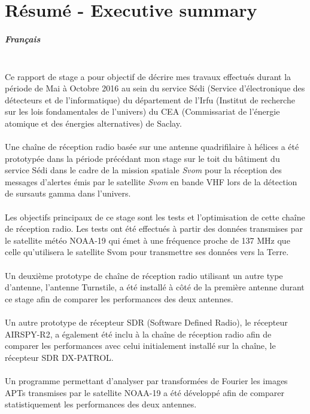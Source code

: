 \documentclass[12pt,fleqn]{book} %
\begin{document}
\pagestyle{fancy} %
\setcounter{part}{-1}
\part{Résumé - Executive summary}
\subsubsection{Français}
~\\\indent Ce rapport de stage a pour objectif de décrire mes travaux effectués durant la période de Mai à Octobre 2016 au sein du service Sédi (Service d'électronique des détecteurs et de l'informatique) du département de l'Irfu (Institut de recherche sur les lois fondamentales de l'univers) du CEA (Commissariat de l'énergie atomique et des énergies alternatives) de Saclay.
~\\\\Une chaîne de réception radio basée sur une antenne quadrifilaire à hélices a été prototypée dans la période précédant mon stage sur le toit du bâtiment du service Sédi dans le cadre de la mission spatiale \emph{Svom} pour la réception des messages d'alertes émis par le satellite \emph{Svom} en bande VHF lors de la détection de sursauts gamma dans l'univers. 
~\\\\Les objectifs principaux de ce stage sont les tests et l'optimisation de cette chaîne de réception radio. Les tests ont été effectués à partir des données transmises par le satellite météo NOAA-19 qui émet à une fréquence proche de 137 MHz que celle qu'utilisera le satellite Svom pour transmettre ses données vers la Terre.
~\\\\Un deuxième prototype de chaîne de réception radio utilisant un autre type d'antenne, l'antenne Turnstile, a été installé à côté de la première antenne durant ce stage afin de comparer les performances des deux antennes. 
~\\\\Un autre prototype de récepteur SDR (Software Defined Radio), le récepteur AIRSPY-R2, a également été inclu à la chaîne de réception radio afin de comparer les performances avec celui initialement installé sur la chaîne, le récepteur SDR DX-PATROL.
~\\\\Un programme permettant d'analyser par transformées de Fourier les images APTs transmises par le satellite NOAA-19 a été développé afin de comparer statistiquement les performances des deux antennes.
\end{document}
